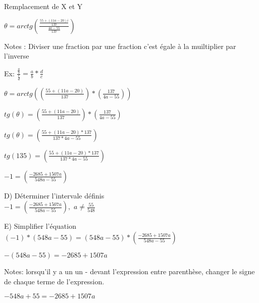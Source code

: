 Remplacement de X et Y
\vspace{5mm} %

$
\theta = arctg(\frac{\frac{55+(11a-20)i}{137}} {\frac{4a-55}{137}})
$
\vspace{5mm} %

Notes : Diviser une fraction par une fraction c'est égale à la muiltiplier par l'inverse
\vspace{5mm} %

Ex:
$
\frac{\frac{a}{b}}{\frac{c}{d}} = \frac{a}{b} * \frac{d}{c}
$
\vspace{5mm} %

$
\theta = arctg((\frac{55+(11a-20)}{137}) * (\frac{137}{4a-55}))
$
\vspace{5mm} %

$
tg(\theta) = (\frac{55+(11a-20)}{137}) * (\frac{137}{4a-55})
$
\vspace{5mm} %

$
tg(\theta) = (\frac{55+(11a-20) *137}{137*4a-55})
$
\vspace{5mm} %

$
tg(135) = (\frac{55+(11a-20) *137}{137*4a-55})
$
\vspace{5mm} %

$
-1 = (\frac{-2685+1507a}{548a-55})
$
\vspace{10mm} %

D) Déterminer l'intervale définis \\

$
-1 = (\frac{-2685+1507a}{548a-55}),
$
$
a\neq \frac{55}{548}
$
\vspace{10mm} %

E) Simplifier l'équation \\

$
(-1)*(548a-55) = (548a-55)*(\frac{-2685+1507a}{548a-55})
$
\vspace{5mm} %

$
-(548a-55) = -2685+1507a
$
\vspace{5mm} %

Notes: lorsqu'il y a un un - devant l'expression entre parenthèse, changer le signe de chaque terme de l'expression.
\vspace{2mm} %

$
-548a+55 = -2685+1507a
$
\vspace{5mm} %

